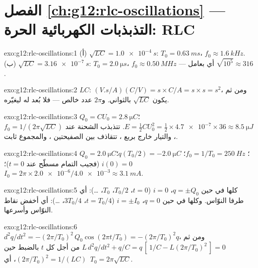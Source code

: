 \section*{الفصل \ref{ch:g12:rlc-oscillations} --- التذبذبات الكهربائية الحرة: RLC}

\begin{solution}{exo:g12:rlc-oscillations:1}
(أ) $\sqrt{LC} = \qty{1.0e-4}{s}$: $T_0 = \qty{0.63}{ms}$،
$f_0 \approx \qty{1.6}{kHz}$. (ب) $\sqrt{LC} = \qty{3.16e-7}{s}$:
$T_0 = \qty{2.0}{\micro s}$، $f_0 \approx \qty{0.50}{MHz}$ --- أي بعامل
$\sqrt{10^5} \approx 316$.
\end{solution}

\begin{solution}{exo:g12:rlc-oscillations:2}
$LC$: $(\unit{V.s/A})(\unit{C/V}) = \unit{s} \times \unit{C/A} =
\unit{s} \times \unit{s} = \unit{s^2}$، ومن ثم يكون $\sqrt{LC}$ بالثواني.
و$2\pi$ عدد خالص --- فلا بُعد له ليغيّره.
\end{solution}

\begin{solution}{exo:g12:rlc-oscillations:3}
$Q_0 = CU_0 = \qty{2.8}{\micro C}$؛ $E = \tfrac12 CU_0^2 =
\tfrac12 \times \num{4.7e-7} \times 36 \approx \qty{8.5}{\micro J}$.
تتذبذب الشحنة عند $f_0 = 1/(2\pi\sqrt{LC})$، والتيار خارج  بربع
،  تتقاذف بين الصفيحتين ، والمجموع
ثابت.
\end{solution}

\begin{solution}{exo:g12:rlc-oscillations:4}
$Q_0 = \qty{2.0}{\micro C}$؛ $f_0 = 1/T_0 = \qty{250}{Hz}$؛
$q(T_0/2) = \qty{-2.0}{\micro C}$؛ $i(0) = 0$ (فجيب التمام مسطّح عند $t=0$)؛
$I_0 = 2\pi \times \num{2.0e-6}/\num{4.0e-3} \approx \qty{3.1}{mA}$.
\end{solution}

\begin{solution}{exo:g12:rlc-oscillations:5}
كلها في  حين $q = \pm Q_0$، $i = 0$ ($t = 0$، $T_0/2$،
$T_0$، \dots): أي طرفا النوّاس. وكلها في  حين $q = 0$،
$i = \pm I_0$ ($t = T_0/4$، $3T_0/4$، \dots): أي أخفض نقاط النوّاس
وأسرعها.
\end{solution}

\begin{solution}{exo:g12:rlc-oscillations:6}
$d^2q/dt^2 = -(2\pi/T_0)^2\,Q_0\cos(2\pi t/T_0) = -(2\pi/T_0)^2 q$،
ومن ثم $L\,d^2q/dt^2 + q/C = q\,[\,1/C - L(2\pi/T_0)^2\,] = 0$ من أجل كل $t$
بالضبط حين $(2\pi/T_0)^2 = 1/(LC)$، أي\ $T_0 = 2\pi\sqrt{LC}$.
\end{solution}

